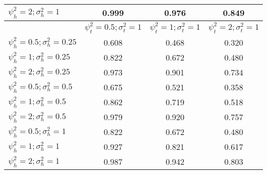 \begin{table}[ht]
{\begin{tabular}{l c c c }
$\psi_h^2 = 2; \sigma_h^2 = 1$ & 0.999 & 0.976 & 0.849 \\
\hline 
& $\psi_t^2 = 0.5; \sigma_t^2 = 1$ & $\psi_t^2 = 1; \sigma_t^2 = 1$ & $\psi_t^2 = 2; \sigma_t^2 = 1$ \\
\cline{2-4}
$\psi_h^2 = 0.5; \sigma_h^2 = 0.25$ & 0.608 & 0.468 & 0.320 \\
$\psi_h^2 = 1; \sigma_h^2 = 0.25$ & 0.822 & 0.672 & 0.480 \\
$\psi_h^2 = 2; \sigma_h^2 = 0.25$ & 0.973 & 0.901 & 0.734 \\
$\psi_h^2 = 0.5; \sigma_h^2 = 0.5$ & 0.675 & 0.521 & 0.358 \\
$\psi_h^2 = 1; \sigma_h^2 = 0.5$ & 0.862 & 0.719 & 0.518 \\
$\psi_h^2 = 2; \sigma_h^2 = 0.5$ & 0.979 & 0.920 & 0.757 \\
$\psi_h^2 = 0.5; \sigma_h^2 = 1$ & 0.822 & 0.672 & 0.480 \\
$\psi_h^2 = 1; \sigma_h^2 = 1$ & 0.927 & 0.821 & 0.617 \\
$\psi_h^2 = 2; \sigma_h^2 = 1$ & 0.987 & 0.942 & 0.803 \\
\bottomrule
\end{tabular}}
\end{table}

